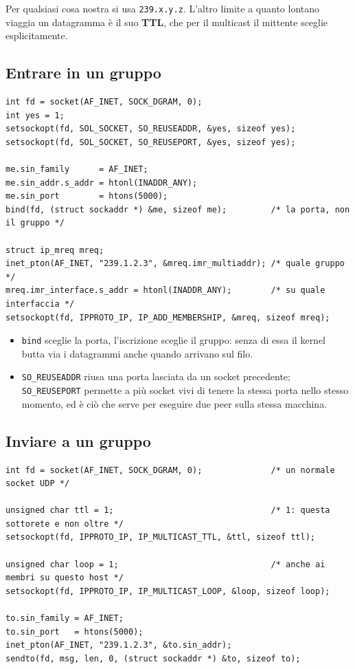 Per qualsiasi cosa nostra si usa \texttt{239.x.y.z}. L'altro limite a quanto lontano viaggia un datagramma è il suo
\textbf{TTL}, che per il multicast il mittente sceglie esplicitamente.

\subsection{Entrare in un gruppo}

\begin{lstlisting}[language={[POSIX]C}, style=wnumbers, title={Iscriversi a 239.1.2.3 sulla porta 5000}]
int fd = socket(AF_INET, SOCK_DGRAM, 0);
int yes = 1;
setsockopt(fd, SOL_SOCKET, SO_REUSEADDR, &yes, sizeof yes);
setsockopt(fd, SOL_SOCKET, SO_REUSEPORT, &yes, sizeof yes);

me.sin_family      = AF_INET;
me.sin_addr.s_addr = htonl(INADDR_ANY);
me.sin_port        = htons(5000);
bind(fd, (struct sockaddr *) &me, sizeof me);         /* la porta, non il gruppo */

struct ip_mreq mreq;
inet_pton(AF_INET, "239.1.2.3", &mreq.imr_multiaddr); /* quale gruppo */
mreq.imr_interface.s_addr = htonl(INADDR_ANY);        /* su quale interfaccia */
setsockopt(fd, IPPROTO_IP, IP_ADD_MEMBERSHIP, &mreq, sizeof mreq);
\end{lstlisting}

\begin{itemize}
    \item \texttt{bind} sceglie la porta, l'iscrizione sceglie il gruppo: senza di essa il kernel butta via i datagrammi
          anche quando arrivano sul filo.
    \item \texttt{SO\_REUSEADDR} riusa una porta lasciata da un socket precedente; \texttt{SO\_REUSEPORT} permette a più
          socket vivi di tenere la stessa porta nello stesso momento, ed è ciò che serve per eseguire due peer sulla stessa
          macchina.
\end{itemize}

\subsection{Inviare a un gruppo}

\begin{lstlisting}[language={[POSIX]C}, style=wnumbers, title={Il mittente}]
int fd = socket(AF_INET, SOCK_DGRAM, 0);              /* un normale socket UDP */

unsigned char ttl = 1;                                /* 1: questa sottorete e non oltre */
setsockopt(fd, IPPROTO_IP, IP_MULTICAST_TTL, &ttl, sizeof ttl);

unsigned char loop = 1;                               /* anche ai membri su questo host */
setsockopt(fd, IPPROTO_IP, IP_MULTICAST_LOOP, &loop, sizeof loop);

to.sin_family = AF_INET;
to.sin_port   = htons(5000);
inet_pton(AF_INET, "239.1.2.3", &to.sin_addr);
sendto(fd, msg, len, 0, (struct sockaddr *) &to, sizeof to);
\end{lstlisting}


